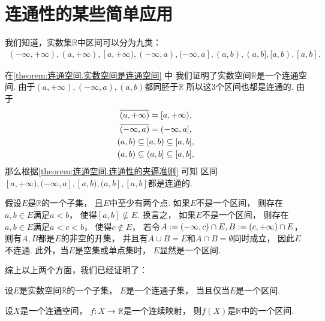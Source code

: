 \section{连通性的某些简单应用}
我们知道，实数集\(\mathbb{R}\)中区间可以分为九类：\begin{gather*}
	(-\infty,+\infty),
	(a,+\infty),
	[a,+\infty),
	(-\infty,a),
	(-\infty,a],
	(a,b),
	(a,b],
	[a,b),
	[a,b].
\end{gather*}

在\cref{theorem:连通空间.实数空间是连通空间} 中
我们证明了实数空间\(\mathbb{R}\)是一个连通空间.
由于\((a,+\infty),(-\infty,a),(a,b)\)都同胚于\(\mathbb{R}\)
所以这3个区间也都是连通的.
由于\begin{gather*}
	\overline{(a,+\infty)}
	= [a,+\infty), \\
	\overline{(-\infty,a)}
	= (-\infty,a], \\
	(a,b) \subseteq [a,b) \subseteq [a,b], \\
	(a,b) \subseteq (a,b] \subseteq [a,b],
\end{gather*}
那么根据\cref{theorem:连通空间.连通性的夹逼准则} 可知
区间\([a,+\infty),(-\infty,a],[a,b),(a,b],[a,b]\)都是连通的.

假设\(E\)是\(\mathbb{R}\)的一个子集，
且\(E\)中至少有两个点.
如果\(E\)不是一个区间，
则存在\(a,b \in E\)满足\(a < b\)，
使得\([a,b] \not\subseteq E\).
换言之，
如果\(E\)不是一个区间，
则存在\(a,b \in E\)满足\(a < c < b\)，
使得\(c \notin E\)，
若令\(A := (-\infty,c) \cap E,
B := (c,+\infty) \cap E\)，
则有\(A,B\)都是\(E\)的非空的开集，
并且有\(A \cup B = E\)和\(A \cap B = \emptyset\)同时成立，
因此\(E\)不连通.
此外，当\(E\)是空集或单点集时，
\(E\)显然是一个区间.

综上以上两个方面，我们已经证明了：
\begin{theorem}
设\(E\)是实数空间\(\mathbb{R}\)的一个子集，
\(E\)是一个连通子集，
当且仅当\(E\)是一个区间.
\end{theorem}

\begin{theorem}\label{theorem:连通空间.从连通空间到实数域的连续映射1}
设\(X\)是一个连通空间，
\(f\colon X \to \mathbb{R}\)是一个连续映射，
则\(f(X)\)是\(\mathbb{R}\)中的一个区间.
\end{theorem}

